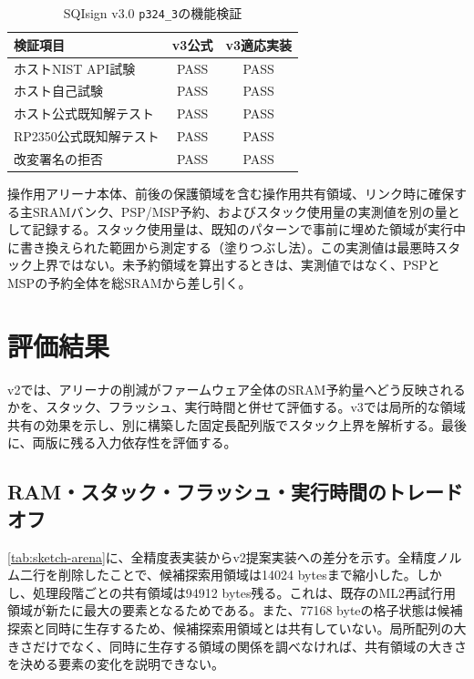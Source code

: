 \documentclass[a4paper,10pt]{ltjsarticle}
\theoremstyle{definition}
\theoremstyle{remark}
\begin{document}
\begin{table}[H]
  \centering
  \caption{SQIsign v3.0 \texttt{p324\_3}の機能検証}
  \label{tab:v3-correctness-gates}
  \small
  \begin{tabularx}{\linewidth}{@{}Xcc@{}}
    \toprule
    検証項目 & v3公式 & v3適応実装 \\
    \midrule
    ホストNIST API試験 & PASS & PASS \\
    ホスト自己試験 & PASS & PASS \\
    ホスト公式既知解テスト & PASS & PASS \\
    RP2350公式既知解テスト & PASS & PASS \\
    改変署名の拒否 & PASS & PASS \\
    \bottomrule
  \end{tabularx}
\end{table}

操作用アリーナ本体、前後の保護領域を含む操作用共有領域、リンク時に確保する主SRAMバンク、PSP/MSP予約、およびスタック使用量の実測値を別の量として記録する。スタック使用量は、既知のパターンで事前に埋めた領域が実行中に書き換えられた範囲から測定する（塗りつぶし法）。この実測値は最悪時スタック上界ではない。未予約領域を算出するときは、実測値ではなく、PSPとMSPの予約全体を総SRAMから差し引く。

\section{評価結果}
\label{sec:results}

v2では、アリーナの削減がファームウェア全体のSRAM予約量へどう反映されるかを、スタック、フラッシュ、実行時間と併せて評価する。v3では局所的な領域共有の効果を示し、別に構築した固定長配列版でスタック上界を解析する。最後に、両版に残る入力依存性を評価する。

\subsection{RAM・スタック・フラッシュ・実行時間のトレードオフ}

\cref{tab:sketch-arena}に、全精度表実装からv2提案実装への差分を示す。全精度ノルム二行を削除したことで、候補探索用領域は\num{14024} bytesまで縮小した。しかし、処理段階ごとの共有領域は\num{94912} bytes残る。これは、既存のML2再試行用領域が新たに最大の要素となるためである。また、\num{77168} byteの格子状態は候補探索と同時に生存するため、候補探索用領域とは共有していない。局所配列の大きさだけでなく、同時に生存する領域の関係を調べなければ、共有領域の大きさを決める要素の変化を説明できない。
\end{document}
